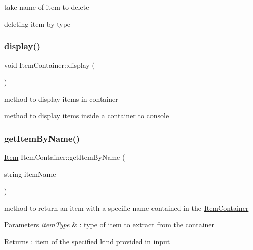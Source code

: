 take name of item to delete 

deleting item by type \hypertarget{class_item_container_abddcd9bd39e7a9df526a90a989e54c76}{}\label{class_item_container_abddcd9bd39e7a9df526a90a989e54c76} 
\subsubsection{\texorpdfstring{display()}{display()}}
{\footnotesize\ttfamily void Item\+Container\+::display (\begin{DoxyParamCaption}{ }\end{DoxyParamCaption})}



method to display items in container 

method to display items inside a container to console \hypertarget{class_item_container_a1a716afac56641809fd09d314ee1da3e}{}\label{class_item_container_a1a716afac56641809fd09d314ee1da3e} 
\subsubsection{\texorpdfstring{get\+Item\+By\+Name()}{getItemByName()}}
{\footnotesize\ttfamily \hyperlink{class_item}{Item} Item\+Container\+::get\+Item\+By\+Name (\begin{DoxyParamCaption}\item[{string}]{item\+Name }\end{DoxyParamCaption})}

method to return an item with a specific name contained in the \hyperlink{class_item_container}{Item\+Container} 
\begin{DoxyParams}{Parameters}
{\em item\+Type} & \+: type of item to extract from the container \\
\hline
\end{DoxyParams}
\begin{DoxyReturn}{Returns}
\+: item of the specified kind provided in input 
\end{DoxyReturn}
\hypertarget{class_item_container_a891f1db61620ef64a8907bc5554cbb42}{}\label{class_item_container_a891f1db61620ef64a8907bc5554cbb42} 
